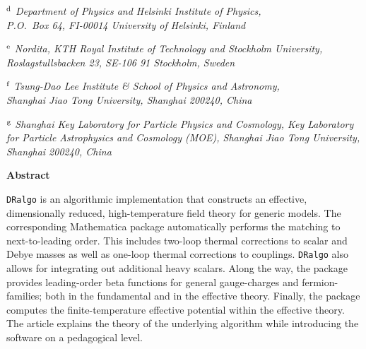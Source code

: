 \documentclass[11pt]{article}
\def\dralgo{{\tt DRalgo}}
\renewcommand{\rmi}[1]{{\mbox{\scriptsize #1}}}
\begin{document}
\begin{titlepage}
\begin{centering}
$^\rmi{d}$%
{\em
Department of Physics and Helsinki Institute of Physics,\\
P.O.~Box 64, FI-00014 University of Helsinki,
Finland\\}
\vspace{0.3cm}

$^\rmi{e}$%
{\em
Nordita,
KTH Royal Institute of Technology and Stockholm University,\\
Roslagstullsbacken 23,
SE-106 91 Stockholm,
Sweden\\}
\vspace{0.3cm}

$^\rmi{f}$%
{\em
Tsung-Dao Lee Institute \& School of Physics and Astronomy,\\
Shanghai Jiao Tong University, Shanghai 200240, China\\}
\vspace{0.3cm}

$^\rmi{g}$%
{\em
Shanghai Key Laboratory for Particle Physics and Cosmology, Key Laboratory for Particle Astrophysics and Cosmology (MOE), Shanghai Jiao Tong University, Shanghai 200240, China\\}

\vspace*{0.8cm}

\mbox{\bf Abstract}

\end{centering}

\vspace*{0.3cm}

\noindent
% 
\dralgo{} is an algorithmic implementation 
that constructs an effective,
dimensionally reduced,
high-temperature field theory for generic models.
The corresponding Mathematica package automatically performs the matching to
next-to-leading order.
This includes
two-loop thermal corrections to scalar and Debye masses as well as 
one-loop thermal corrections to couplings.
\dralgo{} also allows for integrating out additional heavy scalars.
Along the way, the package provides
leading-order beta functions for general gauge-charges and fermion-families; both in
the fundamental and in the effective theory.
Finally, the package computes the finite-temperature effective potential within the effective theory.
The article explains the theory of the underlying algorithm
while introducing the software on a pedagogical level.

\vfill
\end{titlepage}

\tableofcontents
\renewcommand{\thefootnote}{\fnsymbol{footnote}}
\clearpage
\end{document}
